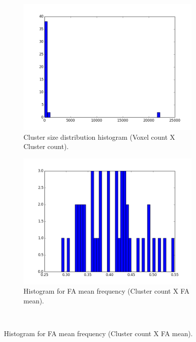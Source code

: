 \documentclass[a4paper,11pt]{report}
\begin{document}
\begin{figure}[!ht]
      \begin{subfigure}[t]{.49\textwidth}
        \includegraphics[width=1\linewidth]{img/histograms/fa_clustered_fa_mask_region_sizes_hist.png}
        \caption{Cluster size distribution histogram (Voxel count X Cluster count).}
        \label{subfig:fa_hist_region}
      \end{subfigure}\hfill%
      \begin{subfigure}[t]{.49\textwidth}
        \includegraphics[width=1\linewidth]{img/histograms/fa_clustered_fa_mask_fa_means_hist.png}
        \caption{Histogram for FA mean frequency (Cluster count X FA mean).}
        \label{subfig:fa_hist_fa}
      \end{subfigure}\hfill\\

\end{figure}
\end{document}
